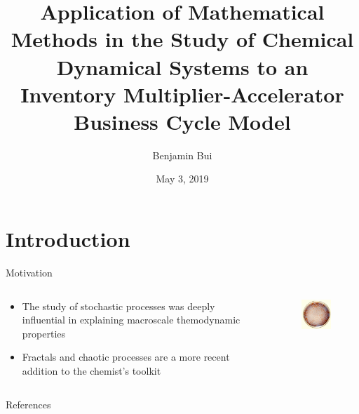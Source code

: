 \documentclass{beamer}
\title{Application of Mathematical Methods in the Study of Chemical Dynamical Systems to an Inventory Multiplier-Accelerator Business Cycle Model}
\author{Benjamin Bui}
\date{May 3, 2019}
\begin{document}
\begin{frame}
	\titlepage
\end{frame}

\section{Introduction}
\begin{frame}{Motivation}
	\begin{columns}
	\begin{column}{0.5\textwidth}
	\begin{itemize}
		\item The study of stochastic processes was deeply influential in explaining macroscale themodynamic properties

		\item Fractals and chaotic processes are a more recent addition to the chemist's toolkit\autocite{Beutel2007,Morris2010}
	\end{itemize}
	\end{column}
	\begin{column}{0.5\textwidth}
		\begin{figure}
			\centering
			\includegraphics{bz_reaction.jpg}
		\end{figure}
	\end{column}
	\end{columns}
\end{frame}

\begin{frame}[allowframebreaks]{References}
	\printbibliography
\end{frame}
\end{document}
